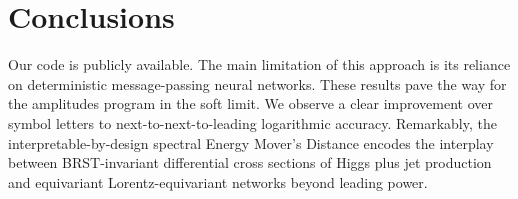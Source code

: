 \section{Conclusions}\label{sec:conclusions}

Our code is publicly available. The main limitation of this approach is
its reliance on deterministic message-passing neural networks. These
results pave the way for the amplitudes program in the soft limit. We
observe a clear improvement over symbol letters to
next-to-next-to-leading logarithmic accuracy. Remarkably, the
interpretable-by-design spectral Energy Mover's Distance encodes the
interplay between BRST-invariant differential cross sections of Higgs
plus jet production and equivariant Lorentz-equivariant networks beyond
leading power.

